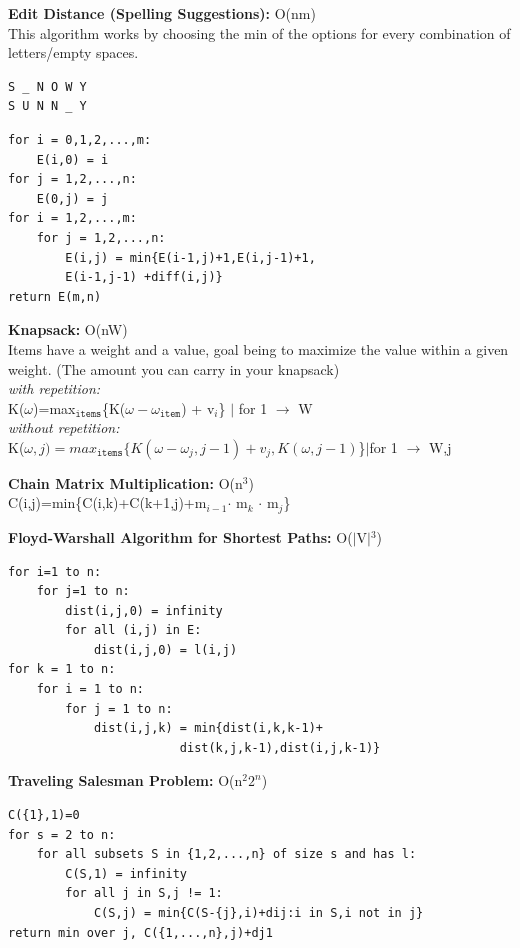 \documentclass[10pt,landscape]{article}
\begin{document}
\begin{multicols}{3}
{\scriptsize {\bf Edit Distance (Spelling Suggestions):} O(nm)\\
This algorithm works by choosing the min of the options for every combination of letters/empty spaces.\vspace{-10pt}
\begin{verbatim}
S _ N O W Y
S U N N _ Y
\end{verbatim}\vspace{-20pt}
\begin{verbatim}
for i = 0,1,2,...,m:
    E(i,0) = i
for j = 1,2,...,n:
    E(0,j) = j
for i = 1,2,...,m:
    for j = 1,2,...,n:
        E(i,j) = min{E(i-1,j)+1,E(i,j-1)+1,
        E(i-1,j-1) +diff(i,j)}
return E(m,n)
\end{verbatim}}

{\scriptsize {\bf Knapsack:} O(nW)\\
Items have a weight and a value, goal being to maximize the value within a given weight. (The amount you can carry in your knapsack)\\
{\it with repetition:}\\
\hspace{15pt}K($\omega$)=max$_{\texttt{items}}$\{K($\omega-\omega_{\texttt{item}}$) + v$_{i}$\} $\mid$ {\tiny for 1 $\rightarrow$ W}\\
{\it without repetition:}\\
\hspace{15pt}K($\omega,j)=max_{\texttt{items}}\{K(\omega-\omega_{j},j-1)+v_{j},K(\omega, j-1)$\}$\mid${\tiny for 1 $\rightarrow$ W,j}}

{\scriptsize {\bf Chain Matrix Multiplication:} O(n$^{3}$)\\
C(i,j)=min\{C(i,k)+C(k+1,j)+m$_{i-1}$$\cdot$ m$_{k}$ $\cdot$ m$_{j}$\}}

{\scriptsize {\bf Floyd-Warshall Algorithm for Shortest Paths:} O($\mid$V$\mid$$^{3}$)\\\vspace{-10pt}
\begin{verbatim}
for i=1 to n:
    for j=1 to n:
        dist(i,j,0) = infinity
        for all (i,j) in E:
            dist(i,j,0) = l(i,j)
for k = 1 to n:
    for i = 1 to n:
        for j = 1 to n:
            dist(i,j,k) = min{dist(i,k,k-1)+
                        dist(k,j,k-1),dist(i,j,k-1)}
\end{verbatim}}

{\scriptsize {\bf Traveling Salesman Problem:} O(n$^{2}2^{n}$)\\\vspace{-10pt}
\begin{verbatim}
C({1},1)=0
for s = 2 to n:
    for all subsets S in {1,2,...,n} of size s and has l:
        C(S,1) = infinity
        for all j in S,j != 1:
            C(S,j) = min{C(S-{j},i)+dij:i in S,i not in j}
return min over j, C({1,...,n},j)+dj1
\end{verbatim}}


\end{multicols}
\end{document}
